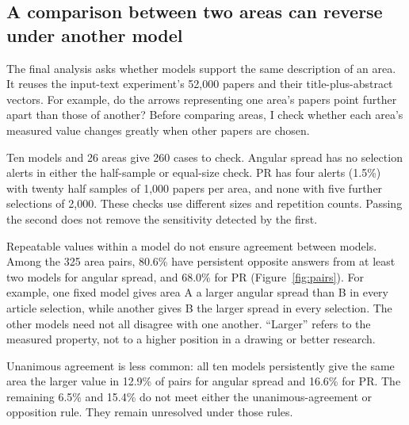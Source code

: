\documentclass[12pt]{article}
\begin{document}
\FloatBarrier
\subsection{A comparison between two areas can reverse under another model}
The final analysis asks whether models support the same description of an area. It reuses the input-text experiment's 52,000 papers and their title-plus-abstract vectors. For example, do the arrows representing one area's papers point further apart than those of another? Before comparing areas, I check whether each area's measured value changes greatly when other papers are chosen.

Ten models and 26 areas give 260 cases to check. Angular spread has no selection alerts in either the half-sample or equal-size check. PR has four alerts (1.5\%) with twenty half samples of 1,000 papers per area, and none with five further selections of 2,000. These checks use different sizes and repetition counts. Passing the second does not remove the sensitivity detected by the first.

Repeatable values within a model do not ensure agreement between models. Among the 325 area pairs, 80.6\% have persistent opposite answers from at least two models for angular spread, and 68.0\% for PR (Figure~\ref{fig:pairs}). For example, one fixed model gives area A a larger angular spread than B in every article selection, while another gives B the larger spread in every selection. The other models need not all disagree with one another. ``Larger'' refers to the measured property, not to a higher position in a drawing or better research.

Unanimous agreement is less common: all ten models persistently give the same area the larger value in 12.9\% of pairs for angular spread and 16.6\% for PR. The remaining 6.5\% and 15.4\% do not meet either the unanimous-agreement or opposition rule. They remain unresolved under those rules.
\end{document}

